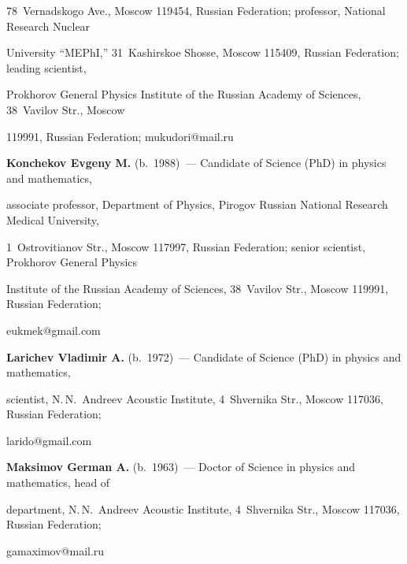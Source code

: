 78~Vernadskogo Ave., Moscow 119454, Russian Federation; professor, National Research Nuclear 

University ``MEPhI,'' 31~Kashirskoe Shosse, Moscow 115409, Russian Federation; leading scientist, 

Prokhorov General Physics Institute of the Russian Academy of Sciences, 38~Vavilov Str., Moscow 

119991, Russian Federation; \mbox{mukudori@mail.ru}



\vspace*{3pt}



\noindent

\textbf{Konchekov Evgeny M.} (b.\ 1988)~--- Candidate of Science (PhD) in physics and mathematics, 

associate professor, Department of Physics, Pirogov Russian National Research Medical University, 

1~Ostrovitianov Str., Moscow 117997, Russian Federation; senior scientist, Prokhorov General Physics 

Institute of the Russian Academy of Sciences, 38~Vavilov Str., Moscow 119991, Russian Federation; 

\mbox{eukmek@gmail.com}



\vspace*{3pt}



\noindent

\textbf{Larichev Vladimir A.} (b.\ 1972)~--- Candidate of Science (PhD) in physics and mathematics, 

scientist, N.\,N.~Andreev Acoustic Institute, 4~Shvernika Str., Moscow 117036, Russian Federation; 

\mbox{larido@gmail.com}



\vspace*{3pt}



\noindent

\textbf{Maksimov German A.} (b.\ 1963)~--- Doctor of Science in physics and mathematics, head of  

department, N.\,N.~Andreev Acoustic Institute, 4~Shvernika Str., Moscow 117036, Russian Federation; 

\mbox{gamaximov@mail.ru}



\label{end\stat}



\renewcommand{\bibname}{\protect\rm Литература} 

